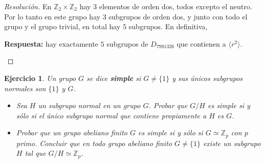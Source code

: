 \documentclass[11pt]{article}
\theoremstyle{colored}
\newtheorem{exercise}{Ejercicio}
\newcommand{\Z}{\mathbb{Z}}
\begin{document}
\begin{proof}[Resolución]
En $\Z_2 \times \Z_2$ hay $3$ elementos de orden dos, todos excepto el neutro. Por lo tanto en este grupo hay $3$ subgrupos de orden dos, y junto con todo el grupo y el grupo trivial, en total hay $5$ subgrupos. En definitiva,

\begin{tcolorbox}[colback=red!12, sharp corners, colframe=white, before upper={\parindent15pt}]
\textbf{Respuesta:} hay exactamente $5$ subgrupos de $D_{7981326}$ que contienen a $\langle r^2 \rangle$.
\end{tcolorbox}
\end{proof}
\newpage
\begin{exercise} Un grupo $G$ se dice \textbf{simple} si $G \neq \{1\}$ y sus únicos subgrupos normales son $\{1\}$ y $G$. 
\begin{itemize}
\item[(i)] Sea $H$ un subgrupo normal en un grupo $G$. Probar que $G/H$ es simple si y sólo si el único subgrupo normal que contiene propiamente a $H$ es $G$.
\item[(ii)] Probar que un grupo abeliano finito $G$ es simple si y sólo si $G \simeq \Z_p$ con $p$ primo. Concluir que en todo grupo abeliano finito $G \neq \{1\}$ existe un subgrupo $H$ tal que $G/H \simeq \Z_p$.
\end{itemize}
\end{exercise}
\end{document}
